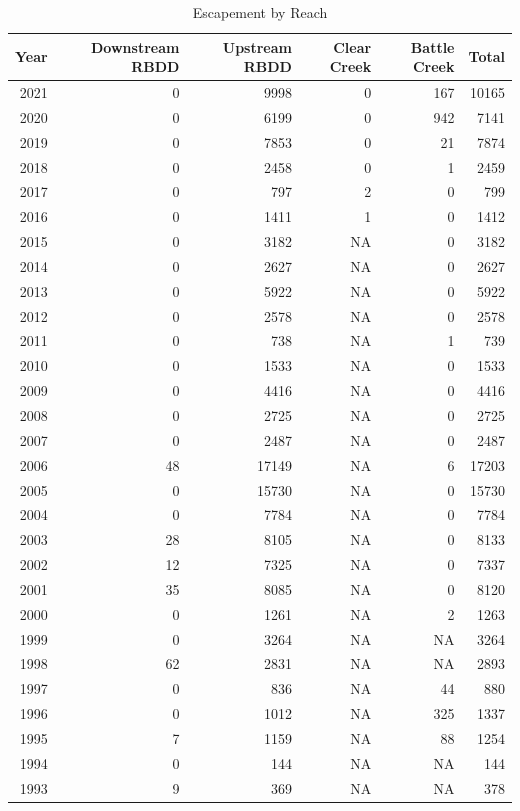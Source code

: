 \documentclass[
]{book}
\theoremstyle{definition}
\theoremstyle{definition}
\theoremstyle{definition}
\theoremstyle{definition}
\theoremstyle{remark}
\begin{document}
\begin{table}
\centering
\caption{Escapement by Reach}
\centering
\begin{tabular}[t]{rrrrrr}
\hline
Year & Downstream RBDD & Upstream RBDD & Clear Creek & Battle Creek & Total\\
\hline
2021 & 0 & 9998 & 0 & 167 & 10165\\
\hline
2020 & 0 & 6199 & 0 & 942 & 7141\\
\hline
2019 & 0 & 7853 & 0 & 21 & 7874\\
\hline
2018 & 0 & 2458 & 0 & 1 & 2459\\
\hline
2017 & 0 & 797 & 2 & 0 & 799\\
\hline
2016 & 0 & 1411 & 1 & 0 & 1412\\
\hline
2015 & 0 & 3182 & NA & 0 & 3182\\
\hline
2014 & 0 & 2627 & NA & 0 & 2627\\
\hline
2013 & 0 & 5922 & NA & 0 & 5922\\
\hline
2012 & 0 & 2578 & NA & 0 & 2578\\
\hline
2011 & 0 & 738 & NA & 1 & 739\\
\hline
2010 & 0 & 1533 & NA & 0 & 1533\\
\hline
2009 & 0 & 4416 & NA & 0 & 4416\\
\hline
2008 & 0 & 2725 & NA & 0 & 2725\\
\hline
2007 & 0 & 2487 & NA & 0 & 2487\\
\hline
2006 & 48 & 17149 & NA & 6 & 17203\\
\hline
2005 & 0 & 15730 & NA & 0 & 15730\\
\hline
2004 & 0 & 7784 & NA & 0 & 7784\\
\hline
2003 & 28 & 8105 & NA & 0 & 8133\\
\hline
2002 & 12 & 7325 & NA & 0 & 7337\\
\hline
2001 & 35 & 8085 & NA & 0 & 8120\\
\hline
2000 & 0 & 1261 & NA & 2 & 1263\\
\hline
1999 & 0 & 3264 & NA & NA & 3264\\
\hline
1998 & 62 & 2831 & NA & NA & 2893\\
\hline
1997 & 0 & 836 & NA & 44 & 880\\
\hline
1996 & 0 & 1012 & NA & 325 & 1337\\
\hline
1995 & 7 & 1159 & NA & 88 & 1254\\
\hline
1994 & 0 & 144 & NA & NA & 144\\
\hline
1993 & 9 & 369 & NA & NA & 378\\

\end{tabular}
\end{table}
\end{document}
